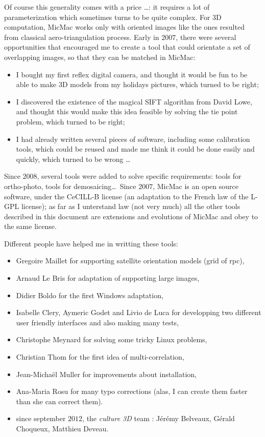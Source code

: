 Of course this generality comes with a price \dots : it requires a lot of parameterization
which sometimes turns to be quite complex.  For 3D computation, MicMac works only 
with oriented images like the ones resulted from classical aero-triangulation process. Early
in $2007$, there were several opportunities that encouraged me to create a 
tool that could orientate a set of overlapping images, so that they can be matched in
MicMac:

\begin{itemize}
   \item  I bought my first reflex digital camera, and thought it would be fun
          to be able to make 3D models from my holidays pictures, which turned to be right;

   \item  I discovered the existence of the magical SIFT algorithm from David Lowe, and thought this
          would make this idea feasible by solving the tie point problem, which turned to be right;

   \item  I had already written several pieces of software, including some calibration tools, which
          could be reused and made me think it could be done easily and quickly, which turned to be wrong \dots
\end{itemize}

Since $2008$, several tools were added to solve specific requirements: tools for ortho-photo, tools
for demosaicing\dots \  Since $2007$,  MicMac is an open source software, under the CeCILL-B license
(an adaptation to the French law of the L-GPL license); as far as I unterstand law (not very much) all
the other tools described in this document are extensions and evolutions of MicMac and obey to
the same license.

Different people have helped me in writting these tools:

\begin{itemize}
   \item Gregoire Maillet for supporting satellite orientation models (grid of rpc),
   \item Arnaud Le Bris for adaptation of \SiftPP supporting large images,
   \item Didier Boldo for the first Windows adaptation,
   \item Isabelle Clery, Aymeric Godet and Livio de Luca for  developping two different user friendly interfaces and
         also making many tests,
   \item Christophe Meynard for solving some tricky Linux problems,
   \item Christian Thom for the first idea of multi-correlation,
   \item Jean-Micha\"el Muller for improvements about installation,
   \item Ana-Maria Rosu for many typo corrections (alas, I can create them faster than she can correct them).
   \item since september $2012$, the \emph{culture 3D} team : J\'er\'emy Belveaux, G\'erald Choqueux, 
         Matthieu Deveau.
\end{itemize}

